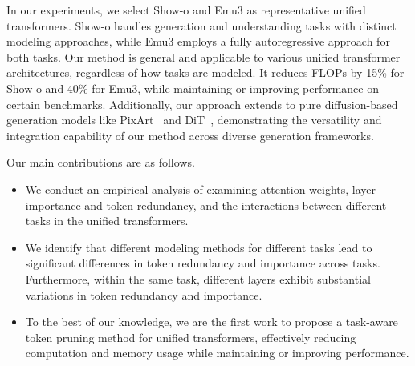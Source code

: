 In our experiments, we select Show-o and Emu3 as representative unified transformers. Show-o handles generation and understanding tasks with distinct modeling approaches, while Emu3 employs a fully autoregressive approach for both tasks. Our method is general and applicable to various unified transformer architectures, regardless of how tasks are modeled. It reduces FLOPs by 15\% for Show-o and 40\% for Emu3, while maintaining or improving performance on certain benchmarks. Additionally, our approach extends to pure diffusion-based generation models like PixArt~\cite{pixart} and DiT~\cite{dit}, demonstrating the versatility and integration capability of our method across diverse generation frameworks.

Our main contributions are as follows.
\begin{itemize}[ itemsep=0em, topsep=0em]
    \itemsep0em 
    \item We conduct an empirical analysis of examining attention weights, layer importance and token redundancy, and the interactions between different tasks in the unified transformers.
    
    \item We identify that different modeling methods for different tasks lead to significant differences in token redundancy and importance across tasks. Furthermore, within the same task, different layers exhibit substantial variations in token redundancy and importance.
    
    \item To the best of our knowledge, we are the first work to propose a task-aware token pruning method for unified transformers, effectively reducing computation and memory usage while maintaining or improving performance.
    
\end{itemize}




    

















